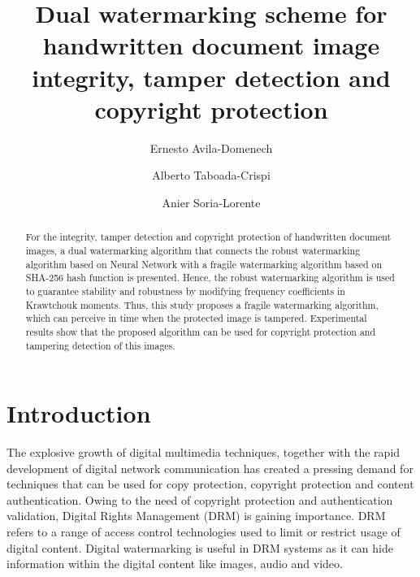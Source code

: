 \documentclass[runningheads]{llncs}
\begin{document}
%
\title{Dual watermarking scheme for handwritten document image integrity, tamper detection and copyright protection}
%
%
\author{Ernesto Avila-Domenech \and
Alberto Taboada-Crispi \and
Anier Soria-Lorente}
%
%
%
\maketitle              %
%
\begin{abstract}
For the integrity, tamper detection and copyright protection of handwritten document images, a dual watermarking algorithm that connects the robust watermarking algorithm based on Neural Network with a fragile watermarking algorithm based on SHA-256 hash function is presented. Hence, the robust watermarking algorithm is used to guarantee stability and robustness by modifying frequency coefficients in Krawtchouk moments. Thus, this study proposes a fragile watermarking algorithm, which can perceive in time when the protected image is tampered. Experimental results show that the proposed algorithm can be used for copyright protection and tampering detection of this images.

\end{abstract}
%
%
%
\section{Introduction}
The explosive growth of digital multimedia techniques, together with the rapid development of digital network communication has created a pressing demand for techniques that can be used for copy protection, copyright protection and content authentication. Owing to the need of copyright protection and authentication validation, Digital Rights Management (DRM) is gaining importance. DRM refers to a range of access control technologies used to limit or restrict usage of digital content. Digital watermarking is useful in DRM systems as it can hide information within the digital content like images, audio and video.
\end{document}
